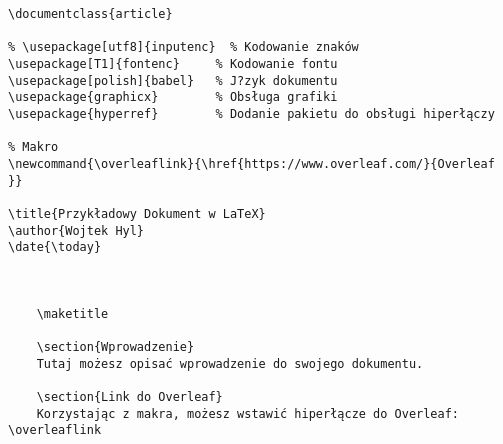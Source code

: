 \begin{lstlisting}[caption={Przykład prostego dokumentu}, label=lst:Przykład prostego dokumentu]
\documentclass{article}

% \usepackage[utf8]{inputenc}  % Kodowanie znaków 
\usepackage[T1]{fontenc}     % Kodowanie fontu
\usepackage[polish]{babel}   % J?zyk dokumentu
\usepackage{graphicx}        % Obsługa grafiki
\usepackage{hyperref}        % Dodanie pakietu do obsługi hiperłączy

% Makro
\newcommand{\overleaflink}{\href{https://www.overleaf.com/}{Overleaf }}

\title{Przykładowy Dokument w LaTeX}
\author{Wojtek Hyl}
\date{\today}


	
	\maketitle
	
	\section{Wprowadzenie}
	Tutaj możesz opisać wprowadzenie do swojego dokumentu.
	
	\section{Link do Overleaf}
	Korzystając z makra, możesz wstawić hiperłącze do Overleaf: \overleaflink
	


\end{lstlisting}



